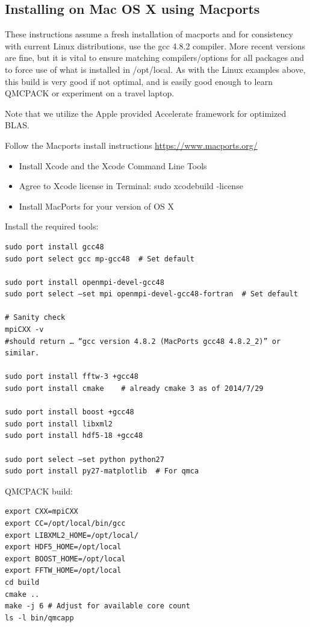 \subsection{Installing on Mac OS X using Macports}
These instructions assume a fresh installation of macports
and for consistency with current Linux distributions, use the gcc 4.8.2
compiler. More recent versions are fine, but it is vital to ensure matching compilers/options for all
packages and to force use of what is installed in /opt/local. As with
the Linux examples above, this build is very good if not optimal, and
is easily good enough to learn QMCPACK or experiment on a travel laptop.

Note that we utilize the Apple provided Accelerate framework for optimized BLAS.

Follow the Macports install instructions \url{https://www.macports.org/}

\begin{itemize}
\item Install Xcode and the Xcode Command Line Tools
\item Agree to Xcode license in Terminal: sudo xcodebuild -license
\item Install MacPorts for your version of OS X
\end{itemize}


Install the required tools:

\begin{verbatim} 
sudo port install gcc48
sudo port select gcc mp-gcc48  # Set default

sudo port install openmpi-devel-gcc48
sudo port select —set mpi openmpi-devel-gcc48-fortran  # Set default

# Sanity check
mpiCXX -v 
#should return … “gcc version 4.8.2 (MacPorts gcc48 4.8.2_2)” or similar.

sudo port install fftw-3 +gcc48
sudo port install cmake    # already cmake 3 as of 2014/7/29

sudo port install boost +gcc48
sudo port install libxml2
sudo port install hdf5-18 +gcc48

sudo port select —set python python27
sudo port install py27-matplotlib  # For qmca
\end{verbatim}

QMCPACK build:
\begin{verbatim}
export CXX=mpiCXX
export CC=/opt/local/bin/gcc
export LIBXML2_HOME=/opt/local/
export HDF5_HOME=/opt/local
export BOOST_HOME=/opt/local
export FFTW_HOME=/opt/local
cd build
cmake ..
make -j 6 # Adjust for available core count
ls -l bin/qmcapp 
\end{verbatim}

